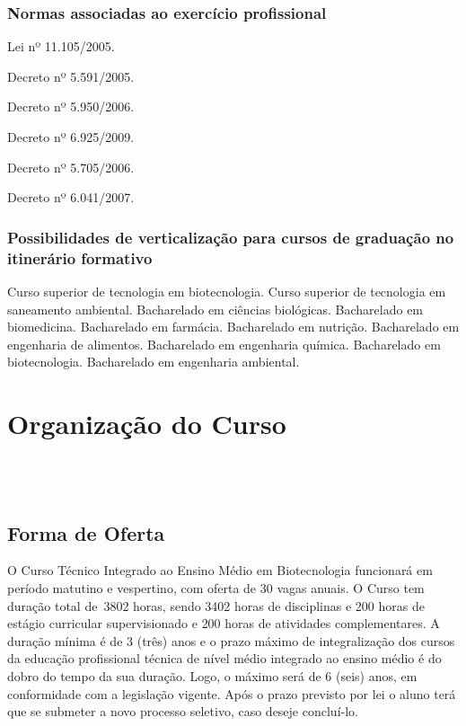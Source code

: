 \documentclass[11pt,fleqn]{book} %
\newcommand{\VER}[1]{\begingroup\color{red}#1\endgroup}
\begin{document}
\subsection{Normas associadas ao exercício profissional}

Lei nº 11.105/2005. 

Decreto nº 5.591/2005. 

Decreto nº 5.950/2006. 

Decreto nº 6.925/2009. 

Decreto nº 5.705/2006. 

Decreto nº 6.041/2007.

\subsection{Possibilidades de verticalização para cursos de graduação no itinerário formativo}

Curso superior de tecnologia em biotecnologia. 
Curso superior de tecnologia em saneamento ambiental. 
Bacharelado em ciências biológicas. 
Bacharelado em biomedicina. 
Bacharelado em farmácia. 
Bacharelado em nutrição. 
Bacharelado em engenharia de alimentos. 
Bacharelado em engenharia química. 
Bacharelado em biotecnologia. 
Bacharelado em engenharia ambiental.


\chapter{Organização do Curso}
\vspace{6em}
\begin{flushright}
	\textit{\textcolor{white}{``O homem, por ser inacabado, tende à perfeição. A educação é, portanto, um
			processo contínuo que só acaba com a morte'' (FURTER, 1973).}}
\end{flushright}
\vspace{12em}

\section{Forma de Oferta}\label{carga}

O Curso Técnico Integrado ao Ensino Médio em Biotecnologia funcionará em período matutino e vespertino, com oferta de 30 vagas anuais. 
O Curso tem duração total de~\VER{3802} horas, sendo \VER{3402} horas de disciplinas e \VER{200} horas de estágio curricular supervisionado e \VER{200} horas de atividades complementares.
A duração mínima é de 3 (três) anos e o prazo máximo de integralização dos cursos da educação profissional técnica de nível médio integrado ao ensino médio é do dobro do tempo da sua duração. 
Logo, o máximo será de 6 (seis) anos, em conformidade com a legislação vigente. 
Após o prazo previsto por lei o aluno terá que se submeter a novo processo seletivo, caso deseje concluí-lo.
\end{document}
